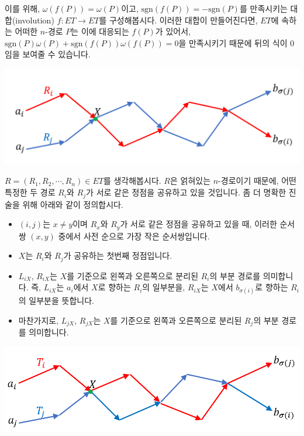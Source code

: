 \documentclass[a4paper]{article}
\begin{document}
이를 위해, $\omega(f(P)) = \omega(P)$이고, $\mathrm{sgn}(f(P)) = -\mathrm{sgn}(P)$를 만족시키는 대합(involution) $f : ET \rightarrow ET$를 구성해봅시다. 이러한 대합이 만들어진다면, $ET$에 속하는 어떠한 $n$-경로 $P$는 이에 대응되는 $f(P)$가 있어서, $\mathrm{sgn}(P)\omega(P) + \mathrm{sgn}(f(P))\omega(f(P)) = 0$을 만족시키기 때문에 뒤의 식이 $0$임을 보여줄 수 있습니다.\\
\begin{center}
\includegraphics[scale=0.6]{image3.png}
\end{center}
$R = (R_1, R_2, \cdots, R_n) \in ET$를 생각해봅시다. $R$은 얽혀있는 $n$-경로이기 때문에, 어떤 특정한 두 경로 $R_i$와 $R_j$가 서로 같은 정점을 공유하고 있을 것입니다. 좀 더 명확한 진술을 위해 아래와 같이 정의합시다.
\begin{itemize}
    \item $(i, j)$는 $x \neq y$이며 $R_x$와 $R_y$가 서로 같은 정점을 공유하고 있을 때, 이러한 순서쌍 $(x, y)$ 중에서 사전 순으로 가장 작은 순서쌍입니다.
    \item $X$는 $R_i$와 $R_j$가 공유하는 첫번째 정점입니다.
    \item $L_{iX}$, $R_{iX}$는 $X$를 기준으로 왼쪽과 오른쪽으로 분리된 $R_i$의 부분 경로를 의미합니다. 즉, $L_{iX}$는 $a_i$에서 $X$로 향하는 $R_i$의 일부분을, $R_{iX}$는 $X$에서 $b_{\sigma(i)}$로 향하는 $R_i$의 일부분을 뜻합니다.
    \item 마찬가지로, $L_{jX}$, $R_{jX}$는 $X$를 기준으로 왼쪽과 오른쪽으로 분리된 $R_j$의 부분 경로를 의미합니다.
\end{itemize}
\begin{center}
\includegraphics[scale=0.6]{image4.png}
\end{center}
\end{document}
